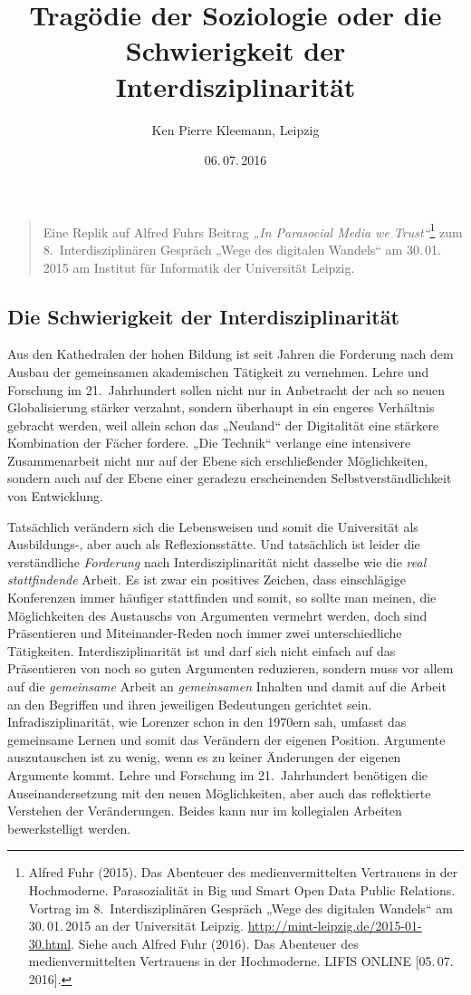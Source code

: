\documentclass[a4paper,11pt]{article}
\title{Tragödie der Soziologie oder die Schwierigkeit der Interdisziplinarität}
\author{Ken Pierre Kleemann, Leipzig}
\date{06.\,07.\,2016}
\begin{document}
\maketitle

\begin{quote}
  Eine Replik auf Alfred Fuhrs Beitrag \emph{„In Parasocial Media we
    Trust“}\footnote{Alfred Fuhr (2015). Das Abenteuer des medienvermittelten
    Vertrauens in der Hochmoderne. Parasozialität in Big und Smart Open Data
    Public Relations.  Vortrag im 8.~Interdisziplinären Gespräch „Wege des
    digitalen Wandels“ am 30.\,01.\,2015 an der Universität Leipzig.
    \url{http://mint-leipzig.de/2015-01-30.html}. Siehe auch Alfred Fuhr
    (2016). Das Abenteuer des medienvermittelten Vertrauens in der
    Hochmoderne. LIFIS ONLINE [05.\,07.\,2016].}  zum 8.~Interdisziplinären
  Gespräch „Wege des digitalen Wandels“ am 30.\,01.\,2015 am Institut für
  Informatik der Universität Leipzig.
\end{quote}

\subsection*{Die Schwierigkeit der Interdisziplinarität}

Aus den Kathedralen der hohen Bildung ist seit Jahren die Forderung nach dem
Ausbau der gemeinsamen akademischen Tätigkeit zu vernehmen. Lehre und Forschung
im 21.~Jahrhundert sollen nicht nur in Anbetracht der ach so neuen
Globalisierung stärker verzahnt, sondern überhaupt in ein engeres Verhältnis
gebracht werden, weil allein schon das „Neuland“ der Digitalität eine stärkere
Kombination der Fächer fordere. „Die Technik“ verlange eine intensivere
Zusammenarbeit nicht nur auf der Ebene sich erschließender Möglichkeiten,
sondern auch auf der Ebene einer geradezu erscheinenden Selbstverständlichkeit
von Entwicklung.

Tatsächlich verändern sich die Lebensweisen und somit die Universität als
Ausbildungs-, aber auch als Reflexionsstätte. Und tatsächlich ist leider die
verständliche \emph{Forderung} nach Interdisziplinarität nicht dasselbe wie die
\emph{real stattfindende} Arbeit. Es ist zwar ein positives Zeichen, dass
einschlägige Konferenzen immer häufiger stattfinden und somit, so sollte man
meinen, die Möglichkeiten des Austauschs von Argumenten vermehrt werden, doch
sind Präsentieren und Miteinander-Reden noch immer zwei unterschiedliche
Tätigkeiten. Interdisziplinarität ist und darf sich nicht einfach auf das
Präsentieren von noch so guten Argumenten reduzieren, sondern muss vor allem
auf die \emph{gemeinsame} Arbeit an \emph{gemeinsamen} Inhalten und damit auf
die Arbeit an den Begriffen und ihren jeweiligen Bedeutungen gerichtet sein.
Infradisziplinarität, wie Lorenzer schon in den 1970ern sah, umfasst das
gemeinsame Lernen und somit das Verändern der eigenen Position. Argumente
auszutauschen ist zu wenig, wenn es zu keiner Änderungen der eigenen Argumente
kommt. Lehre und Forschung im 21.~Jahrhundert benötigen die Auseinandersetzung
mit den neuen Möglichkeiten, aber auch das reflektierte Verstehen der
Veränderungen. Beides kann nur im kollegialen Arbeiten bewerkstelligt werden.
\end{document}
